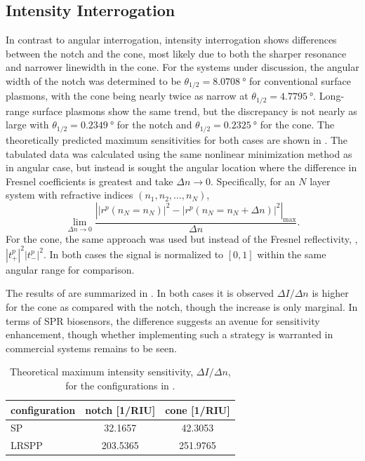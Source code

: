 \subsection{Intensity Interrogation}

In contrast to angular interrogation, intensity interrogation shows
differences between the notch and the cone, most likely due to both the
sharper resonance and narrower linewidth in the cone.  For the systems under
discussion, the angular width of the notch was determined to be
$\theta_{1/2}=\SI{8.0708}{\degree}$ for conventional surface plasmons, with
the cone being nearly twice as narrow at $\theta_{1/2}=\SI{4.7795}{\degree}$.
Long-range surface plasmons show the same trend, but the discrepancy is not
nearly as large with $\theta_{1/2}=\SI{0.2349}{\degree}$ for the notch and
$\theta_{1/2}=\SI{0.2325}{\degree}$ for the cone.  The theoretically predicted
maximum sensitivities for both cases are shown in .
The tabulated data was calculated using the same nonlinear minimization method
as in angular case, but instead is sought the angular location where the
difference in Fresnel coefficients is greatest and take $\Delta n \to 0$.
Specifically, for an $N$ layer system with refractive indices $(n_1,n_2,
\ldots,n_N)$,
\begin{equation}
\lim_{\Delta n \to 0}\frac{\left||r^p(n_N=n_N)|^2 - |r^p(n_N=n_N + \Delta
				n)|^2\right|_\mathrm{max}}{\Delta n}.
\label{eqn:fresnelsenspertrubation}
\end{equation}
For the cone, the same approach was used but instead of the Fresnel
reflectivity, , $|t^p_+|^2|t^p_-|^2$.  In
both cases the signal is normalized to $[0,1]$ within the same angular range
for comparison.

The results of are summarized in
.  In both cases it is observed $\Delta I/\Delta
n$ is higher for the cone as compared with the notch, though the increase
is only marginal.  In terms of SPR biosensors, the difference suggests an
avenue for sensitivity enhancement, though whether implementing such a
strategy is warranted in commercial systems remains to be seen.
\begin{table}[ht]
\centering
{}
\begin{tabular}{lSS}
\toprule
{configuration} & {notch [1/RIU]} & {cone [1/RIU]} \\
\midrule
SP & 32.1657 & 42.3053 \\
LRSPP & 203.5365 & 251.9765 \\
\bottomrule
\end{tabular}
\caption{Theoretical maximum intensity sensitivity, $\Delta I/\Delta n$,
								for the configurations in . }
\label{tbl:intensitysens}
\end{table}


